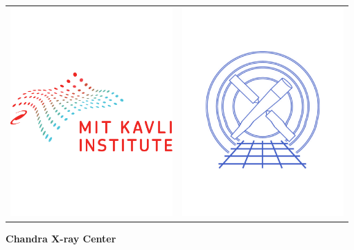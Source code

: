 \documentclass[twoside]{article}
\newcommand{\putdraft}{\special{!userdict begin /bop-hook{gsave 200 30
translate 65 rotate /Times-Roman findfont 216 scalefont setfont 0 0
moveto 0.9 setgray (DRAFT) show grestore}def end}}
\newcommand{\putstring}[6]{
\special{!userdict begin /bop-hook{gsave #1 #2 translate
#3 rotate /Times-Roman findfont #4 scalefont setfont
0 0 moveto #5 setgray (#6) show grestore}def end}
}
\begin{document}


\begin{titlepage}

  \begin{tabular}{p{}>{\raggedleft}p{}}
    \includegraphics[height=8cm]{Kavli_Logo} & \includegraphics[height=8cm]{cxc-logo}
  \end{tabular}
  
  \begin{center}
    \vspace*{.5in}     
    {\Huge\bf Chandra X-ray Center}

    \vspace*{1in}


\end{center}
\end{titlepage}
\end{document}
